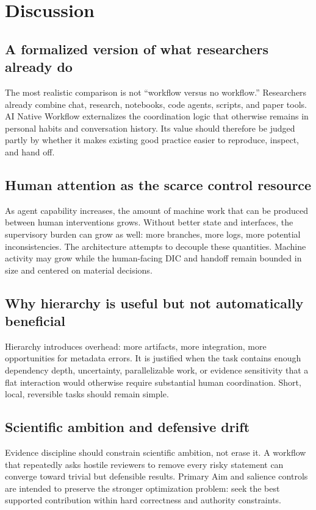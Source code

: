 \documentclass[11pt,a4paper]{article}
\begin{document}
\section{Discussion}\label{sec:discussion}
\subsection{A formalized version of what researchers already do}
The most realistic comparison is not ``workflow versus no workflow.'' Researchers already combine chat, research, notebooks, code agents, scripts, and paper tools. AI Native Workflow externalizes the coordination logic that otherwise remains in personal habits and conversation history. Its value should therefore be judged partly by whether it makes existing good practice easier to reproduce, inspect, and hand off.

\subsection{Human attention as the scarce control resource}
As agent capability increases, the amount of machine work that can be produced between human interventions grows. Without better state and interfaces, the supervisory burden can grow as well: more branches, more logs, more potential inconsistencies. The architecture attempts to decouple these quantities. Machine activity may grow while the human-facing DIC and handoff remain bounded in size and centered on material decisions.

\subsection{Why hierarchy is useful but not automatically beneficial}
Hierarchy introduces overhead: more artifacts, more integration, more opportunities for metadata errors. It is justified when the task contains enough dependency depth, uncertainty, parallelizable work, or evidence sensitivity that a flat interaction would otherwise require substantial human coordination. Short, local, reversible tasks should remain simple.

\subsection{Scientific ambition and defensive drift}
Evidence discipline should constrain scientific ambition, not erase it. A workflow that repeatedly asks hostile reviewers to remove every risky statement can converge toward trivial but defensible results. Primary Aim and salience controls are intended to preserve the stronger optimization problem: seek the best supported contribution within hard correctness and authority constraints.
\end{document}
